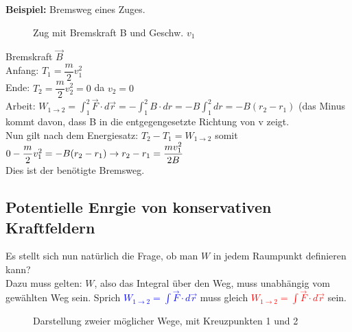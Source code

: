 \documentclass[12pt]{article}
\begin{document}
\textbf{Beispiel:} Bremsweg eines Zuges.\\
\begin{figure}[H]
  \caption{Zug mit Bremskraft B und Geschw. $v_1$}
  \label{fig:1teil}
\end{figure} 
Bremskraft $\vec{B}$\\
Anfang: $T_1 = \dfrac{m}{2}v_1^2$\\
Ende: $T_2 = \dfrac{m}{2}v_2^2 = 0$ da $v_2 = 0$\\
Arbeit: $W_{1\rightarrow 2} = \int_{1}^2 \vec{F} \cdot d\vec{r} = -\int_{1}^2 B \cdot dr = -B \int_{1}^2 dr = -B(r_2 - r_1)$ (das Minus kommt davon, dass B in die entgegengesetzte Richtung von v zeigt.\\
Nun gilt nach dem Energiesatz: $T_2 - T_1 = W_{1\rightarrow 2}$
somit $0-\dfrac{m}{2}v_1^2 = -B(r_2-r_1) \\ \rightarrow r_2-r_1 = \dfrac{mv_1^2}{2B}$ \\Dies ist der benötigte Bremsweg.

\subsection{Potentielle Enrgie von konservativen Kraftfeldern}
Es stellt sich nun natürlich die Frage, ob man $W$ in jedem Raumpunkt definieren kann?\\
Dazu muss gelten: $W$, also das Integral über den Weg, muss unabhängig vom gewählten Weg sein. Sprich \textcolor{blue}{ $W_{1\rightarrow 2} = \int \vec{F} \cdot d\vec{r}$} muss gleich \textcolor{red}{$W_{1\rightarrow 2} = \int \vec{F} \cdot d\vec{r}$} sein.
\begin{figure}[H]
  \caption{Darstellung zweier möglicher Wege, mit Kreuzpunkten 1 und 2}
  \label{fig:1teil}
\end{figure}
\end{document}
